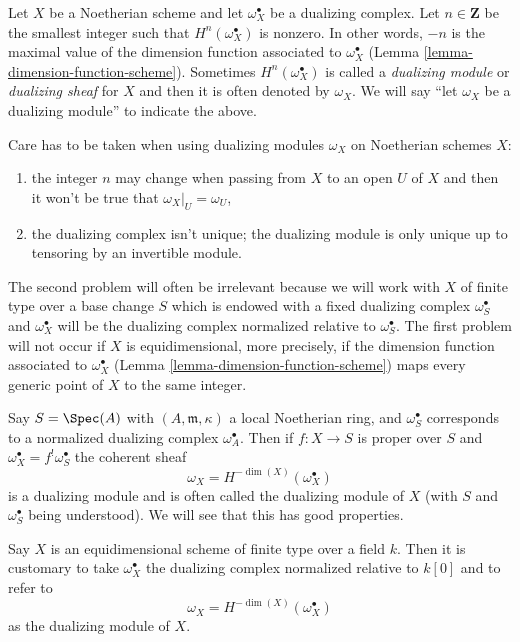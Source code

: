 \medskip\noindent
Let $X$ be a Noetherian scheme and let $\omega_X^\bullet$ be a
dualizing complex. Let $n \in \mathbf{Z}$ be the smallest integer such that
$H^n(\omega_X^\bullet)$ is nonzero. In other words, $-n$ is the maximal
value of the dimension function associated to $\omega_X^\bullet$
(Lemma \ref{lemma-dimension-function-scheme}).
Sometimes $H^n(\omega_X^\bullet)$
is called a {\it dualizing module} or {\it dualizing sheaf}
for $X$ and then it is often denoted
by $\omega_X$. We will say ``let $\omega_X$ be a dualizing module''
to indicate the above.

\medskip\noindent
Care has to be taken when using dualizing modules $\omega_X$ on Noetherian
schemes $X$:
\begin{enumerate}
\item the integer $n$ may change when passing from $X$ to an open $U$
of $X$ and then it won't be true that $\omega_X|_U = \omega_U$,
\item the dualizing complex isn't unique; the dualizing module
is only unique up to tensoring by an invertible module.
\end{enumerate}
The second problem will often be irrelevant because we will work
with $X$ of finite type over a base change $S$ which is
endowed with a fixed dualizing complex $\omega_S^\bullet$ and
$\omega_X^\bullet$ will be the dualizing complex normalized relative
to $\omega_S^\bullet$.
The first problem will not occur if $X$ is equidimensional, more precisely,
if the dimension function associated to $\omega_X^\bullet$
(Lemma \ref{lemma-dimension-function-scheme})
maps every generic point of $X$ to the same integer.

\begin{example}
\label{example-proper-over-local}
Say $S = \Spec(A)$ with $(A, \mathfrak m, \kappa)$
a local Noetherian ring, and $\omega_S^\bullet$ corresponds to
a normalized dualizing complex $\omega_A^\bullet$. Then if
$f : X \to S$ is proper over $S$ and $\omega_X^\bullet = f^!\omega_S^\bullet$
the coherent sheaf
$$
\omega_X = H^{-\dim(X)}(\omega_X^\bullet)
$$
is a dualizing module and is often called the dualizing module
of $X$ (with $S$ and $\omega_S^\bullet$ being understood). We will
see that this has good properties.
\end{example}

\begin{example}
\label{example-equidimensional-over-field}
Say $X$ is an equidimensional scheme of finite type
over a field $k$. Then it is customary to take
$\omega_X^\bullet$ the dualizing complex normalized relative to $k[0]$
and to refer to
$$
\omega_X = H^{-\dim(X)}(\omega_X^\bullet)
$$
as the dualizing module of $X$.
\end{example}

